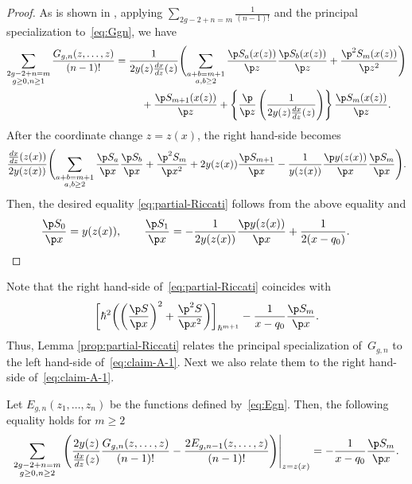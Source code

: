 \begin{proof}
As is shown in \cite[Theorem 6.5]{DM14},
applying $\sum\limits_{2g-2+n=m} \frac{1}{(n-1)!}$
and the principal specia\-li\-zation to~\eqref{eq:Ggn}, we have
\begin{gather*}
\sum_{\substack{2g-2+n=m \\ g\ge0, n\ge 1}}
\frac{G_{g,n}(z,\dots,z)}{(n-1)!} = \frac{1}{2y(z)\frac{dx}{dz}(z)}
\Biggl( \sum_{\substack{a+b=m+1 \\ a,b \ge 2}}
\frac{\p S_{a}(x(z))}{\p z} \frac{\p S_{b}(x(z))}{\p z} +
\frac{\p^{2}S_{m}(x(z))}{\p z^{2}} \Biggr)
\\
\hphantom{\sum_{\substack{2g-2+n=m \\ g\ge0, n\ge 1}}
\frac{G_{g,n}(z,\dots,z)}{(n-1)!} =}{}
+ \frac{\p S_{m+1}(x(z))}{\p z}
+ \left\{ \frac{\p }{\p z}\left(
\frac{1}{2 y(z) \frac{dx}{dz}(z)} \right) \right\}
\frac{\p S_{m}(x(z))}{\p z}.
\end{gather*}
After the coordinate change $z = z(x)$, the right hand-side becomes
\begin{gather*}
\frac{\frac{dx}{dz}(z(x))}{2y(z(x))}\Biggl(
\sum_{\substack{a+b=m+1 \\ a,b \ge 2}}
\frac{\p S_{a}}{\p x} \frac{\p S_{b}}{\p x} +
\frac{\p^{2}S_{m}}{\p x^{2}} + 2y(z(x)) \frac{\p S_{m+1}}{\p x}
- \frac{1}{y(z(x))}\frac{\p y(z(x))}{\p x} \frac{\p S_{m}}{\p x} \Biggr).
\end{gather*}
Then, the desired equality \eqref{eq:partial-Riccati} follows
from the above equality and
\begin{gather*}
\frac{\p S_{0}}{\p x} = y(z(x)), \qquad
\frac{\p S_{1}}{\p x} =
-\frac{1}{2 y(z(x))} \frac{\p y(z(x))}{\p x} + \frac{1}{2(x-q_{0})}.\tag*{\qed}
\end{gather*}
\renewcommand{\qed}{}
\end{proof}

Note that the right hand-side of~\eqref{eq:partial-Riccati} coincides with
\begin{gather*}
\biggl[ \hbar^{2}\biggl( \left(\frac{\p S}{\p x}\right)^{2} +
\frac{\p^{2} S}{\p x^{2}} \biggr)  \biggr]_{\hbar^{m+1}}
- \frac{1}{x-q_{0}} \frac{\p S_{m}}{\p x}.
\end{gather*}
Thus, Lemma \ref{prop:partial-Riccati} relates
the principal specialization of~$G_{g,n}$
to the left hand-side of~\eqref{eq:claim-A-1}.
Next we also relate them to the right hand-side of~\eqref{eq:claim-A-1}.

\begin{lem} \label{lemma:sum-prin-G-and-E}
Let $E_{g,n}(z_{1},\dots,z_{n})$
be the functions defined by~\eqref{eq:Egn}.
Then, the following equality holds for $m \ge 2$
\begin{gather} \label{eq:sum-prin-G-and-E}
\sum_{\substack{2g-2+n=m \\ g \ge 0, n\ge 2 }}
\left(
\frac{2y(z)}{\frac{dx}{dz}(z)}
\frac{G_{g,n}(z,\dots,z)}{(n-1)!} -
\frac{2 E_{g,n-1}(z,\dots,z)}{(n-1)!}\right)\Biggr|_{z=z(x)}
 = -\frac{1}{x-q_{0}} \frac{\p S_{m}}{\p x}.
\end{gather}
\end{lem}

